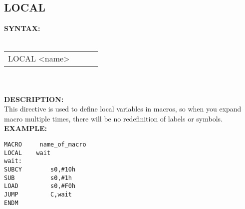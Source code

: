 {                \subsection{LOCAL}
                \textbf{SYNTAX:}\\
                \\ {
                    \texttt{}
                    \begin{tabular}[h!]{llll}
                            { \color{highlight_directive} LOCAL } { \color{highlight_symbol} <name> }
                            { \color{highlight_comment}  }\\
                    \end{tabular}
                    }\\
                    \\
                \textbf{DESCRIPTION:}\\
                This directive is used to define local variables in macros, so when you expand macro multiple times, there will be no redefinition of labels
                or symbols.
                \textbf{EXAMPLE:}\\
                        \begin{code}[h!]
                            {\color{highlight_directive}\verb'MACRO'}\verb'     '\verb'name_of_macro'\\
                            {\color{highlight_directive}\verb'LOCAL'}\verb`    `{\color{highlight_symbol}\verb'wait'}\\
                            {\color{highlight_directive}\verb'wait:'}\\
                            {\color{highlight_symbol}\verb'SUBCY        s0,#10h'}\\
                            {\color{highlight_symbol}\verb'SUB          s0,#1h' }\\
                            {\color{highlight_symbol}\verb'LOAD         s0,#F0h'}\\
                            {\color{highlight_symbol}\verb'JUMP         C,wait'}\\
                            {\color{highlight_directive}\verb'ENDM'}\\
                        \end{code}

}
